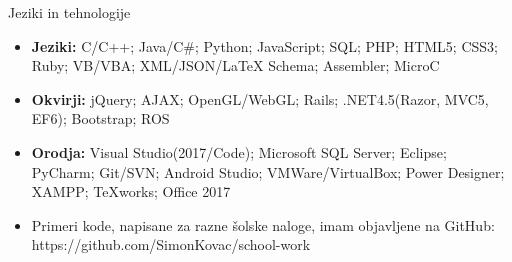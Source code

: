 \documentclass[]{mcdowellcv}
\begin{document}
	\begin{cvsection}{Jeziki in tehnologije}
		\begin{cvsubsection}{}{}{}	
			\begin{itemize}
				\item \textbf{Jeziki:} C/C++; Java/C\#; Python; JavaScript; SQL; PHP; HTML5; CSS3; Ruby; VB/VBA; XML/JSON/LaTeX Schema; Assembler; MicroC
				\item \textbf{Okvirji:} jQuery; AJAX; OpenGL/WebGL; Rails; .NET4.5(Razor, MVC5, EF6); Bootstrap; ROS
				\item \textbf{Orodja:} Visual Studio(2017/Code); Microsoft SQL Server; Eclipse; PyCharm; Git/SVN; Android Studio; VMWare/VirtualBox; Power Designer; XAMPP; TeXworks; Office 2017
				\item Primeri kode, napisane za razne šolske naloge, imam objavljene na GitHub:	\newline https://github.com/SimonKovac/school-work
			\end{itemize}
		\end{cvsubsection}
	\end{cvsection}
	
\end{document}
